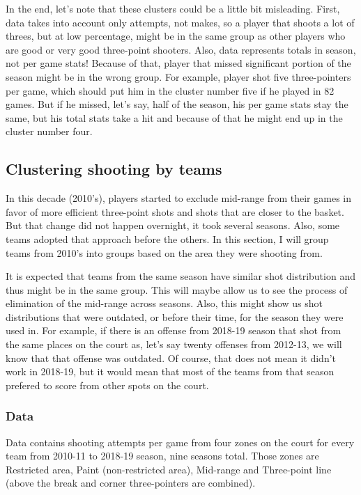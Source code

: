 \documentclass[a4paper]{article}
\begin{document}
In the end, let's note that these clusters could be a little bit misleading. First, data takes into account only attempts, not makes, so a player that shoots a lot of threes, but at low percentage, might be in the same group as other players who are good or very good three-point shooters. Also, data represents totals in season, not per game stats! Because of that, player that missed significant portion of the season might be in the wrong group. For example, player shot five three-pointers per game, which should put him in the cluster number five if he played in 82 games. But if he missed, let's say, half of the season, his per game stats stay the same, but his total stats take a hit and because of that he might end up in the cluster number four.

\subsection{Clustering shooting by teams}
\label{subsec:clust_shooting_by_teams}

In this decade (2010's), players started to exclude mid-range from their games in favor of more efficient three-point shots and shots that are closer to the basket. But that change did not happen overnight, it took several seasons. Also, some teams adopted that approach before the others. In this section, I will group teams from 2010's into groups based on the area they were shooting from.

It is expected that teams from the same season have similar shot distribution and thus might be in the same group. This will maybe allow us to see the process of elimination of the mid-range across seasons. Also, this might show us shot distributions that were outdated, or before their time, for the season they were used in. For example, if there is an offense from 2018-19 season that shot from the same places on the court as, let's say twenty offenses from 2012-13, we will know that that offense was outdated. Of course, that does not mean it didn't work in 2018-19, but it would mean that most of the teams from that season prefered to score from other spots on the court.

\subsubsection{Data}
\label{subsubsec:clust_shooting_by_teams_data}

Data contains shooting attempts per game from four zones on the court for every team from 2010-11 to 2018-19 season, nine seasons total. Those zones are Restricted area, Paint (non-restricted area), Mid-range and Three-point line (above the break and corner three-pointers are combined).
\end{document}
